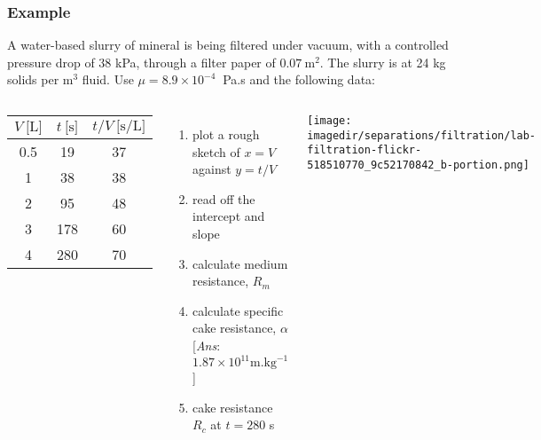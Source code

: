 \begin{frame}\frametitle{Example}
	A water-based slurry of mineral is being filtered under vacuum, with a controlled pressure drop of 38 kPa, through a filter paper of $0.07~\text{m}^2$. The slurry is at 24 kg solids per $\text{m}^3$ fluid. Use $\mu = 8.9 \times 10^{-4}~$ Pa.s and the following data:

	\begin{columns}[t]
			\vspace{-12pt}
			\begin{center}
				\begin{tabular}{c|c||c}
					$V~\text{[L]}$		&	$t~\text{[s]}$  & $t/V~\text{[s/L]}$\\ \hline
					0.5				 	& 	19 & 37\\
					1					& 	38 & 38\\
					2					& 	95 & 48\\
					3					& 	178 & 60\\
					4					&	280 & 70\\ \hline
				\end{tabular}
			\end{center}
			\begin{enumerate}
				\item	plot a rough sketch of $x=V$ against $y=t/V$
				\item	read off the intercept and slope
				\item	calculate medium resistance, $R_m$ 
				\item	calculate specific cake resistance, $\alpha$ {\scriptsize \color{orange}[\emph{Ans}: $1.87 \times 10^{11} \text{m.kg}^{-1}$]}
				\item	cake resistance $R_c$ at $t=280$ s 
			\end{enumerate}
			\begin{center}
				\texttt{[image: \\imagedir/separations/filtration/lab-filtration-flickr-518510770\_9c52170842\_b-portion.png]}
			\end{center}
			\vspace{-2cm}
	\end{columns}
\end{frame}

